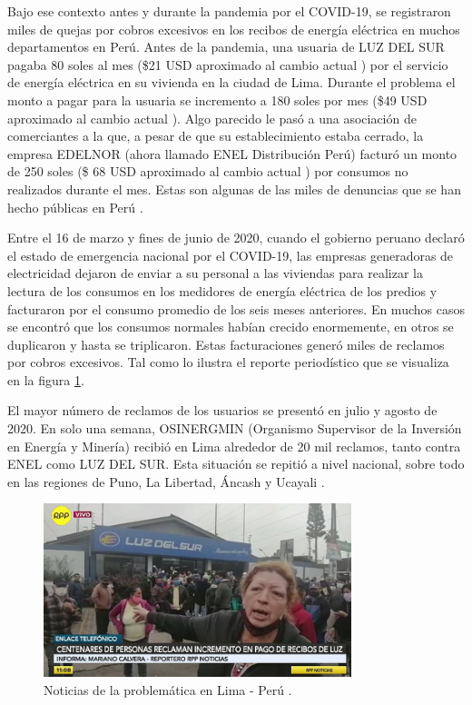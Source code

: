 Bajo ese contexto antes y durante la pandemia por el COVID-19, se registraron miles de quejas por cobros excesivos en los recibos de energía eléctrica en muchos departamentos en Perú. Antes de la pandemia, una usuaria de LUZ DEL SUR \citep{WEBSITE:32} pagaba 80 soles al mes (\$21 USD aproximado al cambio actual \citep{WEBSITE:43}) por el servicio de energía eléctrica en su vivienda en la ciudad de Lima. Durante el problema el monto a pagar para la usuaria se incremento a 180 soles por mes (\$49 USD aproximado al cambio actual \citep{WEBSITE:43}). Algo parecido le pasó a una asociación de comerciantes a la que, a pesar de que su establecimiento estaba cerrado, la empresa EDELNOR (ahora llamado ENEL Distribución Perú) \citep{WEBSITE:33} \citep{WEBSITE:34} facturó un monto de 250 soles (\$ 68 USD aproximado al cambio actual \citep{WEBSITE:43}) por consumos no realizados durante el mes. Estas son algunas de las miles de denuncias que se han hecho públicas en Perú \citep{WEBSITE:1}.

Entre el 16 de marzo y fines de junio de 2020, cuando el gobierno peruano declaró el estado de emergencia nacional por el COVID-19, las empresas generadoras de electricidad dejaron de enviar a su personal a las viviendas para realizar la lectura de los consumos en los medidores de energía eléctrica de los predios y facturaron por el consumo promedio de los seis meses anteriores. En muchos casos se encontró que los consumos normales habían crecido enormemente, en otros se duplicaron y hasta se triplicaron. Estas facturaciones generó miles de reclamos por cobros excesivos. Tal como lo ilustra el reporte periodístico que se visualiza en la figura \ref{fig:noticia}.

El mayor número de reclamos de los usuarios se presentó en julio y agosto de 2020. En solo una semana, OSINERGMIN (Organismo Supervisor de la Inversión en Energía y Minería) recibió en Lima alrededor de 20 mil reclamos, tanto contra ENEL como LUZ DEL SUR. Esta situación se repitió a nivel nacional, sobre todo en las regiones de Puno, La Libertad, Áncash y Ucayali \citep{WEBSITE:1}.

\vspace{1cm}
\begin{figure}[htbp]
\centering
\includegraphics[width=0.8\textwidth]{./Figures/motivacion.jpg}
\caption{Noticias de la problemática en Lima - Perú \protect\footnotemark.}
\label{fig:noticia}
\end{figure}
\vspace{1cm}

